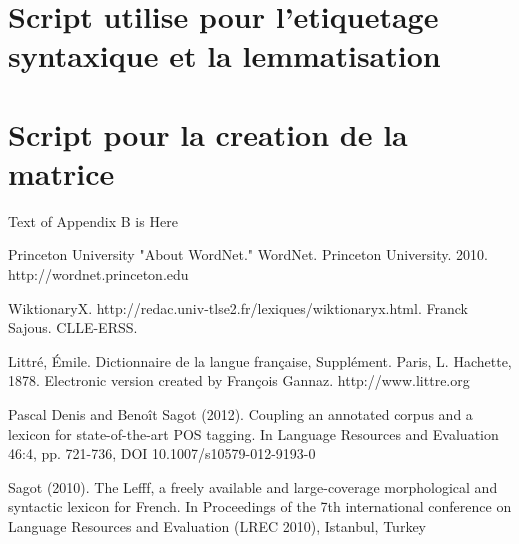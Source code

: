 \documentclass[a4paper, 12pt]{article}
\begin{document}
\section{Script utilise pour l'etiquetage syntaxique et la lemmatisation}\label{App:tag}
%

\section{Script pour la creation de la matrice}\label{App:creatematrix}
Text of Appendix B is Here


\begin{thebibliography}{10}

Princeton University "About WordNet." WordNet. Princeton 
University. 2010. http://wordnet.princeton.edu \label{bib:wordnet}

WiktionaryX. 
http://redac.univ-tlse2.fr/lexiques/wiktionaryx.html. 
Franck Sajous. CLLE-ERSS. \label{bib:wikixml}

Littré, Émile. Dictionnaire de la langue française, 
Supplément. Paris, L. Hachette, 1878. Electronic version created by François 
Gannaz. http://www.littre.org \label{bib:littrexml}

Pascal Denis and Benoît Sagot (2012). Coupling an annotated 
corpus and a lexicon for state-of-the-art POS tagging. In Language Resources 
and Evaluation 46:4, pp. 721-736, DOI 10.1007/s10579-012-9193-0\label{bib:melt} 

Sagot (2010). The Lefff, a freely available and large-coverage 
morphological and syntactic lexicon for French. In Proceedings of the 7th 
international conference on Language Resources and Evaluation (LREC 2010), 
Istanbul, Turkey\label{bib:lefff} 

\end{thebibliography}
\end{document}
